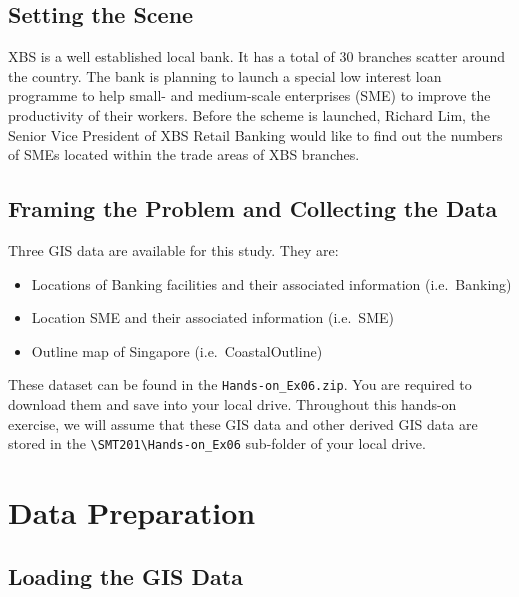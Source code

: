 \documentclass[
  letterpaper,
  DIV=11,
  numbers=noendperiod]{scrreprt}
\providecommand{\tightlist}{%
  \setlength{\itemsep}{0pt}\setlength{\parskip}{0pt}}\usepackage{longtable,booktabs,array}
\begin{document}
\hypertarget{setting-the-scene}{%
\subsection{Setting the Scene}\label{setting-the-scene}}

XBS is a well established local bank. It has a total of 30 branches
scatter around the country. The bank is planning to launch a special low
interest loan programme to help small- and medium-scale enterprises
(SME) to improve the productivity of their workers. Before the scheme is
launched, Richard Lim, the Senior Vice President of XBS Retail Banking
would like to find out the numbers of SMEs located within the trade
areas of XBS branches.

\hypertarget{framing-the-problem-and-collecting-the-data}{%
\subsection{Framing the Problem and Collecting the
Data}\label{framing-the-problem-and-collecting-the-data}}

Three GIS data are available for this study. They are:

\begin{itemize}
\tightlist
\item
  Locations of Banking facilities and their associated information
  (i.e.~Banking)
\item
  Location SME and their associated information (i.e.~SME)
\item
  Outline map of Singapore (i.e.~CoastalOutline)
\end{itemize}

These dataset can be found in the \texttt{Hands-on\_Ex06.zip}. You are
required to download them and save into your local drive. Throughout
this hands-on exercise, we will assume that these GIS data and other
derived GIS data are stored in the
\texttt{\textbackslash{}SMT201\textbackslash{}Hands-on\_Ex06} sub-folder
of your local drive.

\hypertarget{data-preparation-2}{%
\section{Data Preparation}\label{data-preparation-2}}

\hypertarget{loading-the-gis-data}{%
\subsection{Loading the GIS Data}\label{loading-the-gis-data}}
\end{document}
